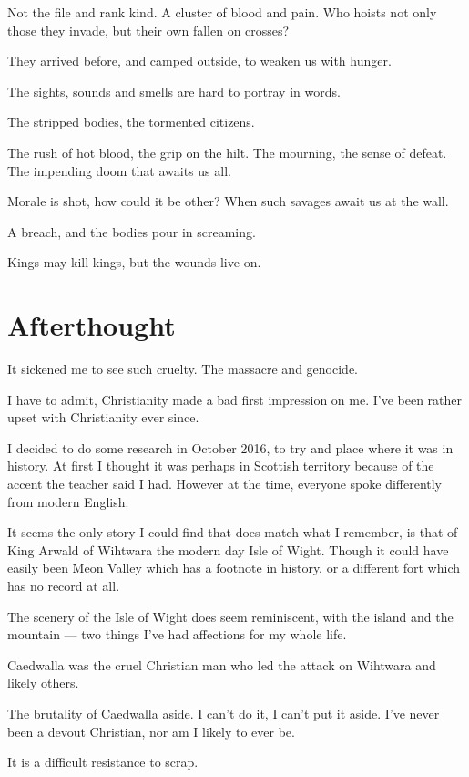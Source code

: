 Not the file and rank kind. A cluster of blood and pain. 
Who hoists not only those they invade, but their own fallen on crosses?

They arrived before, and camped outside, to weaken us with hunger. 

The sights, sounds and smells are hard to portray in words. 

The stripped bodies, the tormented citizens. 

The rush of hot blood, the grip on the hilt. The mourning, the sense of defeat. 
The impending doom that awaits us all. 

Morale is shot, how could it be other? When such savages await us at the wall.

A breach, and the bodies pour in screaming. 

Kings may kill kings, but the wounds live on. 
\section{Afterthought}

It sickened me to see such cruelty. The massacre and genocide. 

I have to admit, Christianity made a bad first impression on me. 
I've been rather upset with Christianity ever since. 

I decided to do some research in October 2016, to try and place where it was in
history. At first I thought it was perhaps in Scottish territory because of the
accent the teacher said I had. However at the time, everyone spoke differently
from modern English. 

It seems the only story I could find that does match what I remember, is that of
King Arwald of Wihtwara the modern day Isle of Wight.  
Though it could have easily been Meon Valley which has a footnote in history, 
or a different fort which has no record at all. 

The scenery of the Isle of Wight does seem reminiscent, with the island and the
mountain --- two things I've had affections for my whole life. 

Caedwalla was the cruel Christian man who led the attack on Wihtwara and likely
others.

The brutality of Caedwalla aside. I can't do it, I can't put it aside. 
I've never been a devout Christian, nor am I likely to ever be. 

It is a difficult resistance to scrap. 

